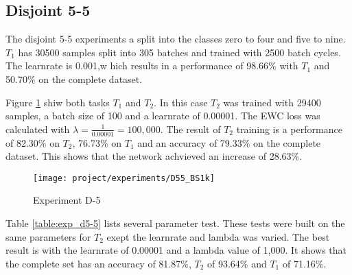 \newpage

\subsection{Disjoint 5-5}

The disjoint 5-5 experiments a split into the classes zero to four and five to nine.
$T_1$ has 30500 samples split into 305 batches and trained with 2500 batch cycles.
The learnrate is 0.001,w hich results in a performance of 98.66\% with $T_1$ and 50.70\% on the complete dataset.

Figure \ref{fig:exp_d5-5_bs1k} shiw both tasks $T_1$ and $T_2$.
In this case $T_2$ was trained with 29400 samples, a batch size of 100 and a learnrate of 0.00001.
The EWC loss was calculated with $\lambda = \frac{1}{0.00001} = 100,000$.
The result of $T_2$ training is a performance of 82.30\% on $T_2$, 76.73\% on $T_1$ and an accuracy of 79.33\% on the complete dataset.
This shows that the network achvieved an increase of 28.63\%.

\begin{figure}[H]
    \centering
    \texttt{[image: project/experiments/D55\_BS1k]}
    \caption{Experiment D-5}
    \label{fig:exp_d5-5_bs1k}
\end{figure}

\newpage

Table \ref{table:exp_d5-5} lists several parameter test.
These tests were built on the same parameters for $T_2$ exept the learnrate and lambda was varied.
The best result is with the learnrate of 0.00001 and a lambda value of 1,000.
It shows that the complete set has an accuracy of 81.87\%, $T_2$ of 93.64\% and $T_1$ of 71.16\%.

